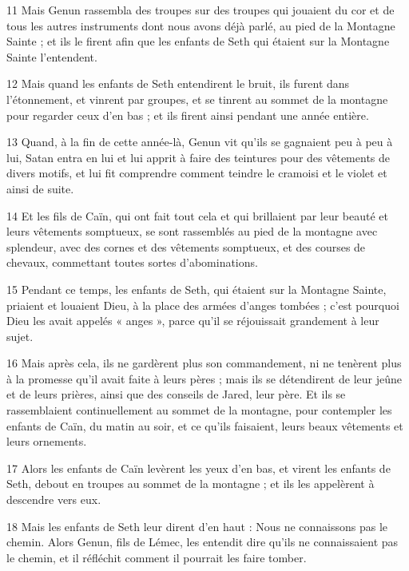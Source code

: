\par 11 Mais Genun rassembla des troupes sur des troupes qui jouaient du cor et de tous les autres instruments dont nous avons déjà parlé, au pied de la Montagne Sainte ; et ils le firent afin que les enfants de Seth qui étaient sur la Montagne Sainte l'entendent.

\par 12 Mais quand les enfants de Seth entendirent le bruit, ils furent dans l'étonnement, et vinrent par groupes, et se tinrent au sommet de la montagne pour regarder ceux d'en bas ; et ils firent ainsi pendant une année entière.

\par 13 Quand, à la fin de cette année-là, Genun vit qu'ils se gagnaient peu à peu à lui, Satan entra en lui et lui apprit à faire des teintures pour des vêtements de divers motifs, et lui fit comprendre comment teindre le cramoisi et le violet et ainsi de suite.

\par 14 Et les fils de Caïn, qui ont fait tout cela et qui brillaient par leur beauté et leurs vêtements somptueux, se sont rassemblés au pied de la montagne avec splendeur, avec des cornes et des vêtements somptueux, et des courses de chevaux, commettant toutes sortes d'abominations.

\par 15 Pendant ce temps, les enfants de Seth, qui étaient sur la Montagne Sainte, priaient et louaient Dieu, à la place des armées d'anges tombées ; c'est pourquoi Dieu les avait appelés « anges », parce qu'il se réjouissait grandement à leur sujet.

\par 16 Mais après cela, ils ne gardèrent plus son commandement, ni ne tenèrent plus à la promesse qu'il avait faite à leurs pères ; mais ils se détendirent de leur jeûne et de leurs prières, ainsi que des conseils de Jared, leur père. Et ils se rassemblaient continuellement au sommet de la montagne, pour contempler les enfants de Caïn, du matin au soir, et ce qu'ils faisaient, leurs beaux vêtements et leurs ornements.

\par 17 Alors les enfants de Caïn levèrent les yeux d'en bas, et virent les enfants de Seth, debout en troupes au sommet de la montagne ; et ils les appelèrent à descendre vers eux.

\par 18 Mais les enfants de Seth leur dirent d'en haut : Nous ne connaissons pas le chemin. Alors Genun, fils de Lémec, les entendit dire qu'ils ne connaissaient pas le chemin, et il réfléchit comment il pourrait les faire tomber.

